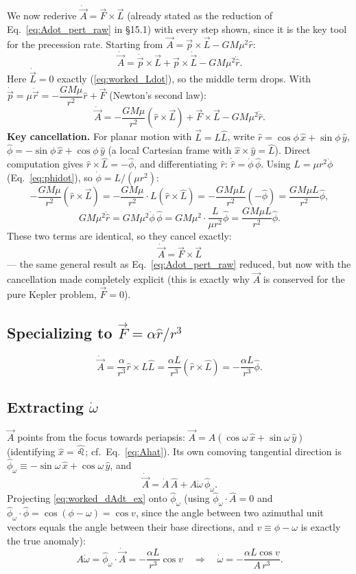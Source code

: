 \documentclass[11pt]{article}
\newcommand{\vecr}{\vec r}
\newcommand{\vecL}{\vec L}
\newcommand{\vecA}{\vec A}
\newcommand{\vecF}{\vec F}
\newcommand{\vecp}{\vec p}
\newcommand{\hatn}{\hat \leo}
\newcommand{\rhat}{\hat r}
\newcommand{\phihat}{\hat\phi}
\begin{document}
We now rederive $\dot{\vecA}=\vecF\times\vecL$ (already stated as the reduction of Eq.~\ref{eq:Adot_pert_raw} in \S15.1) with every step shown, since it is the key tool for the precession rate. Starting from $\vecA=\vecp\times\vecL-GM\mu^2\rhat$:
\[
\dot{\vecA} = \dot{\vecp}\times\vecL+\vecp\times\dot{\vecL}-GM\mu^2\dot{\rhat}.
\]
Here $\dot{\vecL}=0$ exactly (\ref{eq:worked_Ldot}), so the middle term drops. With $\dot{\vecp}=\mu\ddot{\vecr}=-\dfrac{GM\mu}{r^2}\rhat+\vecF$ (Newton's second law):
\[
\dot{\vecA} = -\frac{GM\mu}{r^2}(\rhat\times\vecL)+\vecF\times\vecL-GM\mu^2\dot{\rhat}.
\]
\textbf{Key cancellation.} For planar motion with $\vecL=L\hat L$, write $\rhat=\cos\phi\,\hat x+\sin\phi\,\hat y$, $\phihat=-\sin\phi\,\hat x+\cos\phi\,\hat y$ (a local Cartesian frame with $\hat x\times\hat y=\hat L$). Direct computation gives $\rhat\times\hat L=-\phihat$, and differentiating $\rhat$: $\dot{\rhat}=\dot\phi\,\phihat$. Using $L=\mu r^2\dot\phi$ (Eq.~\ref{eq:phidot}), so $\dot\phi=L/(\mu r^2)$:
\[
-\frac{GM\mu}{r^2}(\rhat\times\vecL) = -\frac{GM\mu}{r^2}\cdot L(\rhat\times\hat L) = -\frac{GM\mu L}{r^2}(-\phihat)=\frac{GM\mu L}{r^2}\phihat,
\]
\[
GM\mu^2\dot{\rhat} = GM\mu^2\dot\phi\,\phihat = GM\mu^2\cdot\frac{L}{\mu r^2}\phihat = \frac{GM\mu L}{r^2}\phihat.
\]
These two terms are identical, so they cancel exactly:
\begin{equation}
\boxed{\dot{\vecA} = \vecF\times\vecL} \label{eq:worked_dAdt_general}
\end{equation}
— the same general result as Eq.~\eqref{eq:Adot_pert_raw} reduced, but now with the cancellation made completely explicit (this is exactly why $\vecA$ is conserved for the pure Kepler problem, $\vecF=0$).

\subsection{Specializing to $\vecF=\alpha\rhat/r^3$}

\[
\dot{\vecA} = \frac{\alpha}{r^3}\rhat\times L\hat L = \frac{\alpha L}{r^3}(\rhat\times\hat L) = -\frac{\alpha L}{r^3}\phihat. \label{eq:worked_dAdt_ex}
\]

\subsection{Extracting $\dot\omega$}

$\vecA$ points from the focus towards periapsis: $\vecA = A(\cos\omega\,\hat x+\sin\omega\,\hat y)$ (identifying $\hat x=\hatn$; cf.\ Eq.~\ref{eq:Ahat}). Its own comoving tangential direction is $\hat\phi_\omega \equiv -\sin\omega\,\hat x+\cos\omega\,\hat y$, and
\[
\dot{\vecA} = \dot A\,\hat A + A\dot\omega\,\hat\phi_\omega.
\]
Projecting \eqref{eq:worked_dAdt_ex} onto $\hat\phi_\omega$ (using $\hat\phi_\omega\cdot\hat A=0$ and $\hat\phi_\omega\cdot\phihat=\cos(\phi-\omega)=\cos v$, since the angle between two azimuthal unit vectors equals the angle between their base directions, and $v\equiv\phi-\omega$ is exactly the true anomaly):
\[
A\dot\omega = \hat\phi_\omega\cdot\dot{\vecA} = -\frac{\alpha L}{r^3}\cos v
\quad\Longrightarrow\quad
\dot\omega = -\frac{\alpha L\cos v}{A\,r^3}. \label{eq:worked_domegadt_inst}
\]
\end{document}
